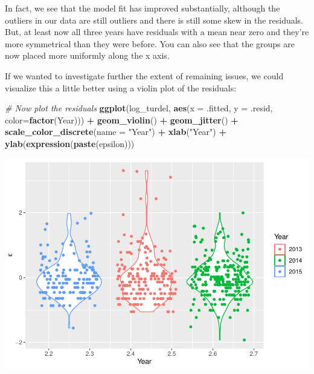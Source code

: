 \documentclass[
]{book}
\newenvironment{Shaded}{\begin{snugshade}}{\end{snugshade}}
\newcommand{\CommentTok}[1]{\textcolor[rgb]{0.56,0.35,0.01}{\textit{#1}}}
\newcommand{\DataTypeTok}[1]{\textcolor[rgb]{0.13,0.29,0.53}{#1}}
\newcommand{\KeywordTok}[1]{\textcolor[rgb]{0.13,0.29,0.53}{\textbf{#1}}}
\newcommand{\NormalTok}[1]{#1}
\newcommand{\OperatorTok}[1]{\textcolor[rgb]{0.81,0.36,0.00}{\textbf{#1}}}
\newcommand{\StringTok}[1]{\textcolor[rgb]{0.31,0.60,0.02}{#1}}
\begin{document}
In fact, we see that the model fit has improved substantially, although the outliers in our data are still outliers and there is still some skew in the residuals. But, at least now all three years have residuals with a mean near zero and they're more symmetrical than they were before. You can also see that the groups are now placed more uniformly along the x axis.

If we wanted to investigate further the extent of remaining issues, we could visualize this a little better using a violin plot of the residuals:

\begin{Shaded}
\begin{Highlighting}[]
\CommentTok{# Now plot the residuals}
\KeywordTok{ggplot}\NormalTok{(log_turdel, }\KeywordTok{aes}\NormalTok{(}\DataTypeTok{x =}\NormalTok{ .fitted, }\DataTypeTok{y =}\NormalTok{ .resid, }\DataTypeTok{color=}\KeywordTok{factor}\NormalTok{(Year))) }\OperatorTok{+}\StringTok{ }
\StringTok{  }\KeywordTok{geom_violin}\NormalTok{() }\OperatorTok{+}
\StringTok{  }\KeywordTok{geom_jitter}\NormalTok{() }\OperatorTok{+}
\StringTok{  }\KeywordTok{scale_color_discrete}\NormalTok{(}\DataTypeTok{name =} \StringTok{"Year"}\NormalTok{) }\OperatorTok{+}
\StringTok{  }\KeywordTok{xlab}\NormalTok{(}\StringTok{"Year"}\NormalTok{) }\OperatorTok{+}\StringTok{ }
\StringTok{  }\KeywordTok{ylab}\NormalTok{(}\KeywordTok{expression}\NormalTok{(}\KeywordTok{paste}\NormalTok{(epsilon)))}
\end{Highlighting}
\end{Shaded}

\includegraphics{worstr_files/figure-latex/unnamed-chunk-238-1.pdf}
\end{document}
